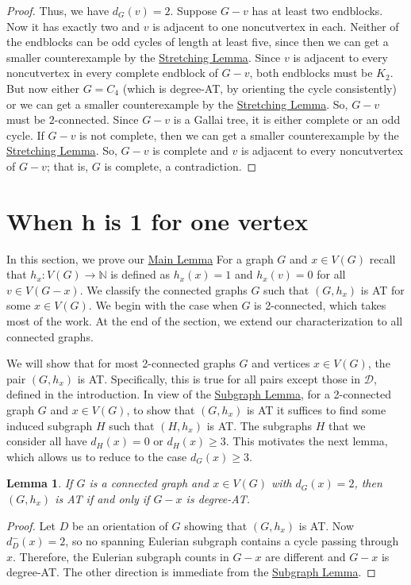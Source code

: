 \documentclass[12pt]{article}
\theoremstyle{plain}
\newtheorem{lem}[thm]{Lemma}
\theoremstyle{definition}
\theoremstyle{remark}
\newcommand{\fancy}[1]{\mathcal{#1}}
\newcommand{\IN}{\mathbb{N}}
\newcommand{\D}{\fancy{D}}
\newcommand{\func}[3]{#1\colon #2 \rightarrow #3}
\def\D{\fancy{D}}
\begin{document}
\begin{proof}
		Thus, we have $d_G(v) = 2$.  Suppose $G-v$ has at least two endblocks. 
		Now it has exactly two and $v$ is adjacent to one noncutvertex in each. 
		Neither of the endblocks can be odd cycles of length at least five, since then
		we can get a smaller counterexample by the \hyperlink{target:SubdivideTwice}{Stretching Lemma}.  Since $v$ is adjacent to every noncutvertex in every
		complete endblock of $G-v$, both endblocks must be $K_2$.  But now either
		$G=C_4$ (which is degree-AT, by orienting the cycle consistently) or we can get
		a smaller counterexample by the \hyperlink{target:SubdivideTwice}{Stretching Lemma}. 
		So, $G-v$ must be $2$-connected. Since $G-v$ is a Gallai tree, it is either
		complete or an odd cycle.  If $G-v$ is not complete, then we can get a smaller
		counterexample by the \hyperlink{target:SubdivideTwice}{Stretching Lemma}.  So, $G-v$
		is complete and $v$ is adjacent to every noncutvertex of $G-v$; that is, $G$ is
		complete, a contradiction.
	\end{proof}
	
	\section{When h is 1 for one vertex}
	\label{MainThmSec}
	
	In this section, we prove our \hyperlink{target:mainLemma}{Main Lemma}
	For a graph $G$ and $x \in V(G)$ recall that
	$\func{h_x}{V(G)}{\IN}$ is defined as $h_x(x) = 1$ and $h_x(v) = 0$ for all $v
	\in V(G-x)$. We classify the connected graphs $G$ such that $(G,h_x)$ is AT for
	some $x \in V(G)$.  We begin with the case when $G$ is 2-connected, which takes
	most of the work.  At the end of the section, we extend our characterization to
	all connected graphs.
	
	We will show that for most 2-connected graphs $G$ and vertices $x\in V(G)$, the
	pair $(G,h_x)$ is AT.  Specifically, this is true for all pairs except those in
	$\D$, defined in the introduction.  In view of the
	\hyperlink{target:InducedSubgraph}{Subgraph Lemma}, for a 2-connected graph $G$ and
	$x\in V(G)$, to show that $(G,h_x)$ is AT it suffices to
	find some induced subgraph $H$ such that $(H,h_x)$ is AT. 
	The subgraphs $H$ that we consider all have $d_H(x)=0$ or $d_H(x)\ge 3$.  This
	motivates the next lemma, which allows us to reduce to the case $d_G(x)\ge 3$.
	
	\begin{lem}
		\label{DegreeTwoVertex}
		If $G$ is a connected graph and $x \in V(G)$ with $d_G(x) = 2$, then $(G,h_x)$
		is AT if and only if $G-x$ is degree-AT.
	\end{lem}
	\begin{proof}
		Let $D$ be an orientation of $G$ showing that $(G,h_x)$ is AT.  Now
		$d_{D}^-(x) = 2$, so no spanning Eulerian subgraph contains a cycle
		passing through $x$.  Therefore, the Eulerian subgraph counts in $G-x$ are
		different and $G-x$ is degree-AT.  The other direction is immediate from the
		\hyperlink{target:InducedSubgraph}{Subgraph Lemma}.
	\end{proof}
	
\end{document}
